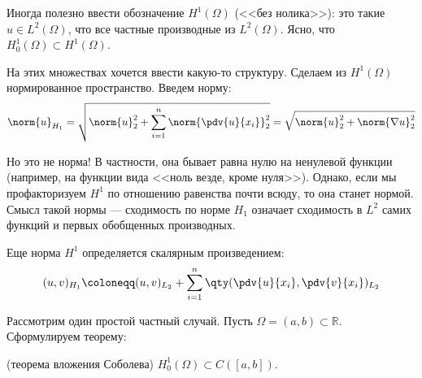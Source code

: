 Иногда полезно ввести обозначение $H^1(\Omega)$ (<<без нолика>>): это такие $u \in L^2(\Omega)$, что все частные производные из $L^2(\Omega)$. Ясно, что $H_0^1(\Omega) \subset H^1(\Omega)$.

На этих множествах хочется ввести какую-то структуру. Сделаем из $H^1(\Omega)$ нормированное пространство. Введем норму:
\begin{equation}
  \norm{u}_{H_1} = \sqrt{\norm{u}_2^2 + \sum_{i=1}^n \norm{\pdv{u}{x_i}}_2^2} = \sqrt{\norm{u}_2^2 + \norm{\nabla u}_2^2}
\end{equation}

Но это не норма! В частности, она бывает равна нулю на ненулевой функции (например, на функции вида <<ноль везде, кроме нуля>>). Однако, если мы профакторизуем $H^1$ по отношению равенства почти всюду, то она станет нормой. Смысл такой нормы --- сходимость по норме $H_1$ означает сходимость в $L^2$ самих функций и первых обобщенных производных.


Еще норма $H^1$ определяется скалярным произведением:
\begin{equation}
  (u, v)_{H_1} \coloneqq (u, v)_{L_2} + \sum_{i=1}^n \qty(\pdv{u}{x_i}, \pdv{v}{x_i})_{L_2}
\end{equation}
\bigskip

Рассмотрим один простой частный случай. Пусть $\Omega = (a, b) \subset \mathbb{R}$. Сформулируем теорему:
\begin{thm}(теорема вложения Соболева)
  $H_0^1(\Omega) \subset C([a, b])$.
\end{thm}

